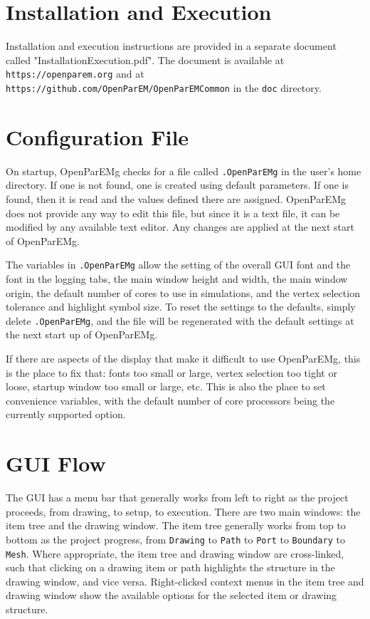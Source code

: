 \documentclass[titlepage]{article}
\renewcommand\_{\textunderscore\linebreak[1]}
\begin{document}
\section{Installation and Execution}

Installation and execution instructions are provided in a separate document called \newline"Installation\_Execution.pdf".  The document is available at \texttt{https://openparem.org} and at \newline\texttt{https://github.com/OpenParEM/OpenParEMCommon} in the \texttt{doc} directory.

\section{Configuration File}

On startup, OpenParEMg checks for a file called \texttt{.OpenParEMg} in the user's home directory.  If one is not found, one is created using default parameters.  If one is found, then it is read and the values defined there are assigned.  OpenParEMg does not provide any way to edit this file, but since it is a text file, it can be modified by any available text editor.  Any changes are applied at the next start of OpenParEMg.

The variables in \texttt{.OpenParEMg} allow the setting of the overall GUI font and the font in the logging tabs, the main window height and width, the main window origin, the default number of cores to use in simulations, and the vertex selection tolerance and highlight symbol size.  To reset the settings to the defaults, simply delete \texttt{.OpenParEMg}, and the file will be regenerated with the default settings at the next start up of OpenParEMg.

If there are aspects of the display that make it difficult to use OpenParEMg, this is the place to fix that: fonts too small or large, vertex selection too tight or loose, startup window too small or large, etc.  This is also the place to set convenience variables, with the default number of core processors being the 
currently supported option.  

\section{GUI Flow}

The GUI has a menu bar that generally works from left to right as the project proceeds, from drawing, to setup, to execution.  There are two main windows: the item tree and the drawing window.  The item tree generally works from top to bottom as the project progress, from \texttt{Drawing} to \texttt{Path} to \texttt{Port} to \texttt{Boundary} to \texttt{Mesh}.  Where appropriate, the item tree and drawing window are cross-linked, such that clicking on a drawing item or path highlights the structure in the drawing window, and vice versa.  Right-clicked context menus in the item tree and drawing window show the available options for the selected item or drawing structure.
\end{document}
